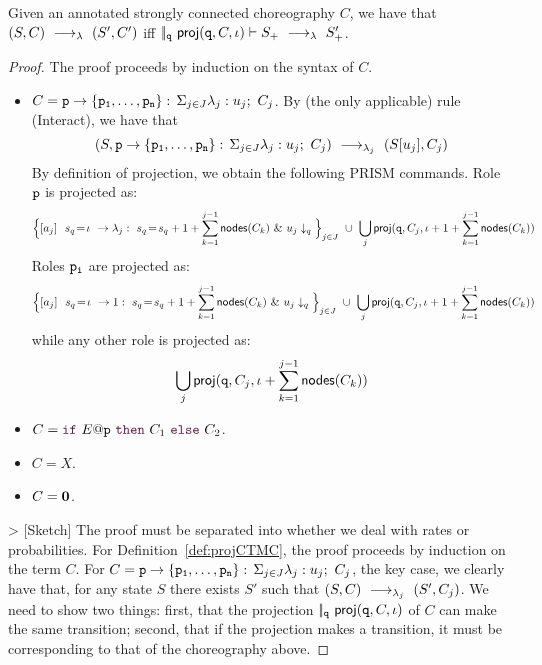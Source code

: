 \begin{theorem}[EPP]\label{thm:epp}
  Given an annotated strongly connected choreography $C$, we have that
  $(S,C) \ \longrightarrow_{\lambda}\  (S', C')$ iff
  $|\!|_{\mathtt{q}}\ \mathsf{proj} (\mathtt{q}, C,\iota)\vdash S_{+} \ \longrightarrow_{\lambda}\ 
  S_{+}'$.
\end{theorem}
\begin{proof}
  The proof proceeds by induction on the syntax of $C$.
  \begin{itemize}
  \item $C=\mathtt{p}\rightarrow \{\mathtt{\mathtt{p}_1,\ldots,\mathtt{p}_n}\}:\,\Sigma_{j\in J}\lambda_j: u_j;\ C_j$.  By (the only
    applicable) rule \textsf{(Interact)}, we have that
    \[
      (S, \mathtt{p}\rightarrow \{\mathtt{\mathtt{p}_1,\ldots,\mathtt{p}_n}\}:\,\Sigma_{j\in J}\lambda_j: u_j;\ C_j)
      \ \longrightarrow_{\lambda_j}\  (S[u_j], C_j) 
    \]
    By definition of projection, we obtain the following PRISM
    commands. Role $\mathtt{p}$ is projected as:
    \[
      \Big\{[a_j]\ \ s_{q}\!=\! \iota\ \rightarrow \lambda_j:\ s_{q}\!=\!
        s_{q} +1+\sum_{k=1}^{j-1}\mathsf{nodes}({C_k})\ \&\ u_j\downarrow_q\Big\}_{j\in J}
      \ \cup\ \bigcup_{j} \mathsf{proj} (\mathtt{q}, C_j,
      \iota+1+\sum_{k=1}^{j-1}\mathsf{nodes}({C_k}))
    \]
    Roles $\mathtt{p_i}$ are projected as:
    \[
      \Big\{[a_j]\ \ s_{q}\!=\! \iota\ \rightarrow 1:\ s_{q}\!=\!
        s_{q} +1+\sum_{k=1}^{j-1}\mathsf{nodes}({C_k})\ \&\ u_j\downarrow_q\Big\}_{j\in J}
      \ \cup\ \bigcup_{j} \mathsf{proj} (\mathtt{q}, C_j, \iota+1+\sum_{k=1}^{j-1}\mathsf{nodes}({C_k}))
    \]
    while any other role is projected as: 
    \[\bigcup_{j} \mathsf{proj} (\mathtt{q}, C_j, \iota+\sum_{k=1}^{j-1}\mathsf{nodes}({C_k}))
    \]

  \item $C=\ifTE {E}{p}{C_1}{C_2}$.

  \item $C=X$.

  \item $C=\mathbf{0}$.

  \end{itemize}




  > [Sketch] The proof must be separated into whether we deal with
  rates or probabilities. For Definition~\ref{def:projCTMC}, the proof
  proceeds by induction on the term $C$. For
  $C=\mathtt{p}\rightarrow \{\mathtt{\mathtt{p}_1,\ldots,\mathtt{p}_n}\}:\,\Sigma_{j\in J}\lambda_j: u_j;\ C_j$, the key case, we
  clearly have that, for any state $S$ there exists $S'$ such that
  $(S,C)\ \longrightarrow_{\lambda_j}\ (S',C_j)$. We need to show two things: first,
  that the projection $|\!|_{\mathtt{q}}\ \mathsf{proj}{(\mathtt{q},C,\iota)}$ of $C$
  can make the same transition; second, that if the projection makes a
  transition, it must be corresponding to that of the choreography
  above.


\end{proof}

